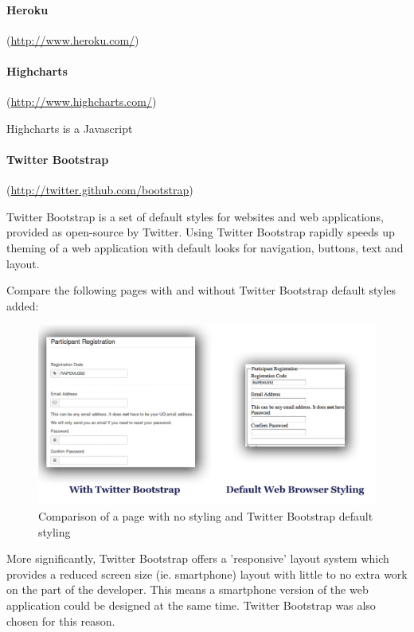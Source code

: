 
\paragraph{Heroku}
(\url{http://www.heroku.com/})


\paragraph{Highcharts}
(\url{http://www.highcharts.com/})

Highcharts is a Javascript 

\paragraph{Twitter Bootstrap}
(\url{http://twitter.github.com/bootstrap})

Twitter Bootstrap is a set of default styles for websites and web applications, provided as open-source by Twitter. Using Twitter Bootstrap rapidly speeds up theming of a web application with default looks for navigation, buttons, text and layout.


Compare the following pages with and without Twitter Bootstrap default styles added:
\begin{figure}[h!]
\includegraphics[width=120mm]{img/twitterbootstrap.jpg}
\caption{Comparison of a page with no styling and Twitter Bootstrap default styling}
\end{figure}

More significantly, Twitter Bootstrap offers a 'responsive' layout 
system which provides a reduced screen size (ie. smartphone) layout
 with little to no extra work on the part of the developer. This 
 means a smartphone version of the web application could be designed
  at the same time. Twitter Bootstrap was also chosen for this reason.
